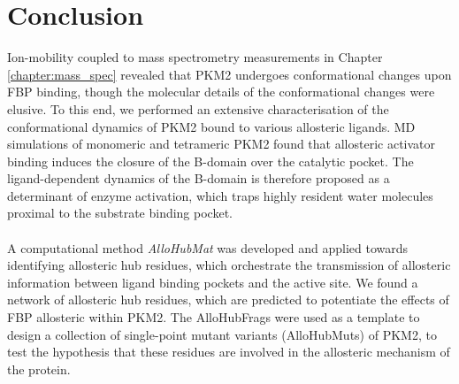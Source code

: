 \clearpage

\section{Conclusion}
Ion-mobility coupled to mass spectrometry measurements in Chapter \ref{chapter:mass_spec} revealed that PKM2 undergoes conformational changes upon FBP binding, though the molecular details of the conformational changes were elusive. To this end, we performed an extensive characterisation of the conformational dynamics of PKM2 bound to various allosteric ligands. MD simulations of monomeric and tetrameric PKM2 found that allosteric activator binding induces the closure of the B-domain over the catalytic pocket. The ligand-dependent dynamics of the B-domain is therefore proposed as a determinant of enzyme activation, which traps highly resident water molecules proximal to the substrate binding pocket. 
%
%
\\\\
%
%
A computational method \textit{AlloHubMat} was developed and applied towards identifying allosteric hub residues, which orchestrate the transmission of allosteric information between ligand binding pockets and the active site. We found a network of allosteric hub residues, which are predicted to potentiate the effects of FBP allosteric within PKM2. The AlloHubFrags were used as a template to design a collection of single-point mutant variants (AlloHubMuts) of PKM2, to test the hypothesis that these residues are involved in the allosteric mechanism of the protein.







